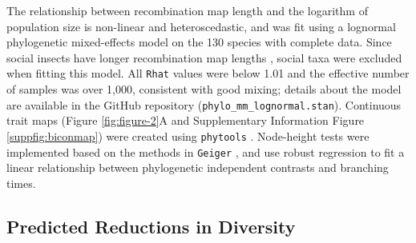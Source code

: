 \documentclass[11pt]{article}
\begin{document}
The relationship between recombination map length and the logarithm of
population size is non-linear and heteroscedastic, and was fit using a
lognormal phylogenetic mixed-effects model on the 130 species with complete
data. Since social insects have longer recombination map lengths
\parencite{Wilfert2007-dx}, social taxa were excluded when fitting this model.
All \texttt{Rhat} \parencite{Vehtari2019-po} values were below 1.01 and the
effective number of samples was over 1,000, consistent with good mixing;
details about the model are available in the GitHub repository
(\texttt{phylo\_mm\_lognormal.stan}). Continuous trait maps (Figure
\ref{fig:figure-2}A and Supplementary Information Figure \ref{suppfig:biconmap})
were created using \texttt{phytools} \parencite{Revell2012-zq}. Node-height
tests were implemented based on the methods in \texttt{Geiger}
\parencite{Pennell2014-nx,Harmon2008-tr}, and use robust regression to fit a
linear relationship between phylogenetic independent contrasts and branching
times.

\subsection*{Predicted Reductions in Diversity}
\label{sec:methods-reduction}
\end{document}
